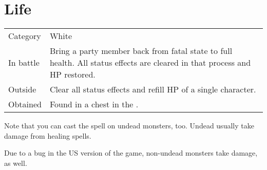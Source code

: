 \section{Life}
\label{spell:life}


\noindent\begin{tabularx}{\textwidth}[l]{lX}
	Category
	& White
\\
	In battle
	& Bring a party member back from fatal state to full health. All status effects are cleared in that process and HP restored.
\\
	Outside
	& Clear all status effects and refill HP of a single character.
\\
	Obtained
	& Found in a chest in the \nameref{map:lava_dome}.
\end{tabularx}

Note that you can cast the spell on undead monsters, too. Undead usually take damage from healing spells. 

\bigskip

Due to a bug in the US version of the game, non-undead monsters take damage, as well.
